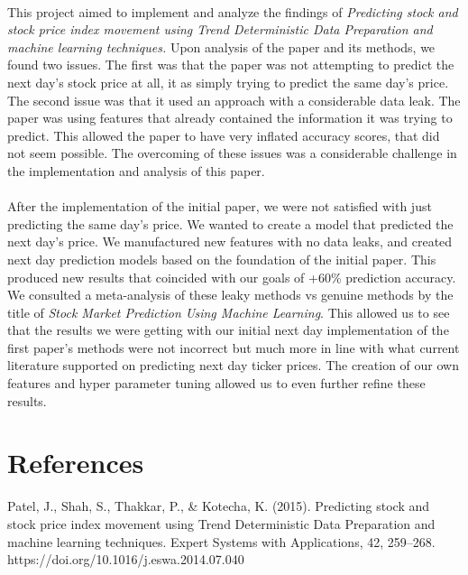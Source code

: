 \documentclass[11pt]{article}
\begin{document}
		\paragraph{} This project aimed to implement and analyze the findings of \textit{Predicting stock and stock price index movement using Trend Deterministic Data Preparation and machine learning techniques.} Upon analysis of the paper and its methods, we found two issues. The first was that the paper was not attempting to predict the next day's stock price at all, it as simply trying to predict the same day's price. The second issue was that it used an approach with a considerable data leak. The paper was using features that already contained the information it was trying to predict. This allowed the paper to have very inflated accuracy scores, that did not seem possible. The overcoming of these issues was a considerable challenge in the implementation and analysis of this paper. 
		
		\paragraph{} After the implementation of the initial paper, we were not satisfied with just predicting the same day's price. We wanted to create a model that predicted the next day's price. We manufactured new features with no data leaks, and created next day prediction models based on the foundation of the initial paper. This produced new results that coincided with our goals of +60\% prediction accuracy. We consulted a meta-analysis of these leaky methods vs genuine methods by the title of \textit{Stock Market Prediction Using Machine Learning}. This allowed us to see that the results we were getting with our initial next day implementation of the first paper's methods were not incorrect but much more in line with what current literature supported on predicting next day ticker prices. The creation of our own features and hyper parameter tuning allowed us to even further refine these results.
		
	
	\section{References}
	
	Patel, J., Shah, S., Thakkar, P., \& Kotecha, K. (2015). Predicting stock and stock price index movement using Trend Deterministic Data Preparation and machine learning techniques. Expert Systems with Applications, 42, 259–268. \\ https://doi.org/10.1016/j.eswa.2014.07.040 \\
	
\end{document}
